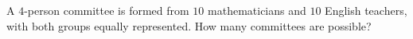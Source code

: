 A $4$-person committee is formed from $10$ mathematicians and $10$ English teachers, with both groups equally represented. How many committees are possible?
